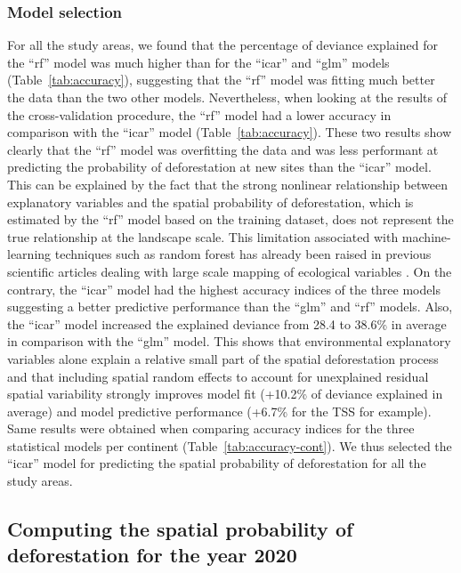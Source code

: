 \documentclass[
  12pt,
]{article}
\begin{document}
\hypertarget{model-selection}{%
\subsubsection{Model selection}\label{model-selection}}

For all the study areas, we found that the percentage of deviance explained for the ``rf'' model was much higher than for the ``icar'' and ``glm'' models (Table~\ref{tab:accuracy}), suggesting that the ``rf'' model was fitting much better the data than the two other models. Nevertheless, when looking at the results of the cross-validation procedure, the ``rf'' model had a lower accuracy in comparison with the ``icar'' model (Table~\ref{tab:accuracy}). These two results show clearly that the ``rf'' model was overfitting the data and was less performant at predicting the probability of deforestation at new sites than the ``icar'' model. This can be explained by the fact that the strong nonlinear relationship between explanatory variables and the spatial probability of deforestation, which is estimated by the ``rf'' model based on the training dataset, does not represent the true relationship at the landscape scale. This limitation associated with machine-learning techniques such as random forest has already been raised in previous scientific articles dealing with large scale mapping of ecological variables \citep{Ploton2020}. On the contrary, the ``icar'' model had the highest accuracy indices of the three models suggesting a better predictive performance than the ``glm'' and ``rf'' models. Also, the ``icar'' model increased the explained deviance from 28.4 to 38.6\% in average in comparison with the ``glm'' model. This shows that environmental explanatory variables alone explain a relative small part of the spatial deforestation process and that including spatial random effects to account for unexplained residual spatial variability strongly improves model fit (+10.2\% of deviance explained in average) and model predictive performance (+6.7\% for the TSS for example). Same results were obtained when comparing accuracy indices for the three statistical models per continent (Table~\ref{tab:accuracy-cont}). We thus selected the ``icar'' model for predicting the spatial probability of deforestation for all the study areas.

\hypertarget{computing-the-spatial-probability-of-deforestation-for-the-year-2020}{%
\subsection{Computing the spatial probability of deforestation for the year 2020}\label{computing-the-spatial-probability-of-deforestation-for-the-year-2020}}
\end{document}
